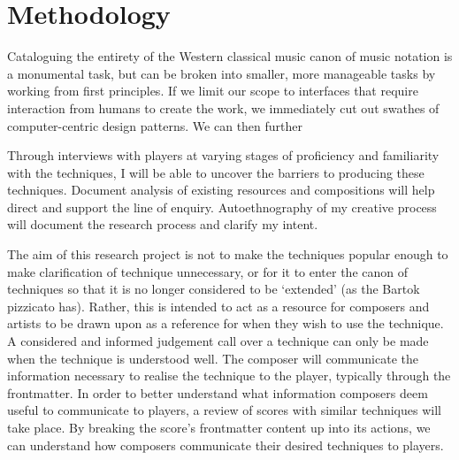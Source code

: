 \section{Methodology}

Cataloguing the entirety of the Western classical music canon of music notation is a monumental task, but can be broken into smaller, more manageable tasks by working from first principles.
If we limit our scope to interfaces that require interaction from humans to create the work, we immediately cut out swathes of computer-centric design patterns.
We can then further 

Through interviews with players at varying stages of proficiency and familiarity with the techniques, I will be able to uncover the barriers to producing these techniques. 
Document analysis of existing resources and compositions will help direct and support the line of enquiry. 
Autoethnography of my creative process will document the research process and clarify my intent.  

The aim of this research project is not to make the techniques popular enough to make clarification of technique unnecessary, or for it to enter the canon of techniques so that it is no longer considered to be `extended' (as the Bartok pizzicato has).
Rather, this is intended to act as a resource for composers and artists to be drawn upon as a reference for when they wish to use the technique.
A considered and informed judgement call over a technique can only be made when the technique is understood well.
The composer will communicate the information necessary to realise the technique to the player, typically through the frontmatter. 
In order to better understand what information composers deem useful to communicate to players, a review of scores with similar techniques will take place.
By breaking the score's frontmatter content up into its actions, we can understand how composers communicate their desired techniques to players.